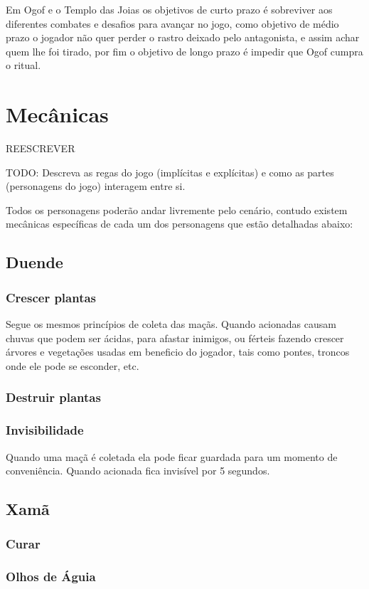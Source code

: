 Em Ogof e o Templo das Joias os objetivos de curto prazo é sobreviver aos diferentes combates e desafios para avançar no jogo, como objetivo de médio prazo o jogador não quer perder o rastro deixado pelo antagonista, e assim achar quem lhe foi tirado, por fim o objetivo de longo prazo é impedir que Ogof cumpra o ritual.

\section{Mecânicas}
REESCREVER

TODO: Descreva as regas do jogo (implícitas e explícitas) e como as partes (personagens do jogo) interagem entre si.

Todos os personagens poderão andar livremente pelo cenário, contudo existem mecânicas específicas de cada um dos personagens que estão detalhadas abaixo:


\subsection{Duende}
\subsubsection{Crescer plantas}
Segue os mesmos princípios de coleta das maçãs. Quando acionadas causam chuvas que podem ser ácidas, para afastar inimigos, ou férteis fazendo crescer árvores e vegetações usadas em beneficio do jogador, tais como pontes, troncos onde ele pode se esconder, etc.
\subsubsection{Destruir plantas}
\subsubsection{Invisibilidade}
Quando uma maçã é coletada ela pode ficar guardada para um momento de conveniência. Quando acionada fica invisível por 5 segundos.

\subsection{Xamã}

\subsubsection{Curar}
\subsubsection{Olhos de Águia}

